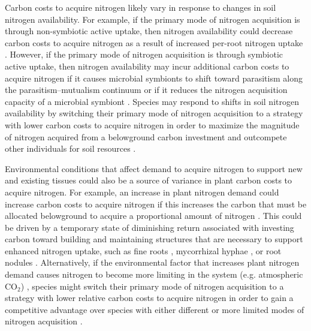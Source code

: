 Carbon costs to acquire nitrogen likely vary in response to changes in soil nitrogen availability. For example, if the primary mode of nitrogen acquisition is through non-symbiotic active uptake, then nitrogen availability could decrease carbon costs to acquire nitrogen as a result of increased per-root nitrogen uptake . However, if the primary mode of nitrogen acquisition is through symbiotic active uptake, then nitrogen availability may incur additional carbon costs to acquire nitrogen if it causes microbial symbionts to shift toward parasitism along the parasitism–mutualism continuum  or if it reduces the nitrogen acquisition capacity of a microbial symbiont . Species may respond to shifts in soil nitrogen availability by switching their primary mode of nitrogen acquisition to a strategy with lower carbon costs to acquire nitrogen in order to maximize the magnitude of nitrogen acquired from a belowground carbon investment and outcompete other individuals for soil resources .

Environmental conditions that affect demand to acquire nitrogen to support new and existing tissues could also be a source of variance in plant carbon costs to acquire nitrogen. For example, an increase in plant nitrogen demand could increase carbon costs to acquire nitrogen if this increases the carbon that must be allocated belowground to acquire a proportional amount of nitrogen . This could be driven by a temporary state of diminishing return associated with investing carbon toward building and maintaining structures that are necessary to support enhanced nitrogen uptake, such as fine roots , mycorrhizal hyphae , or root nodules . Alternatively, if the environmental factor that increases plant nitrogen demand causes nitrogen to become more limiting in the system (e.g. atmospheric CO$_2$) , species might switch their primary mode of nitrogen acquisition to a strategy with lower relative carbon costs to acquire nitrogen in order to gain a competitive advantage over species with either different or more limited modes of nitrogen acquisition .

